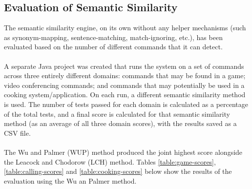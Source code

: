 \documentclass[11pt]{article}
\begin{document}
\subsection{Evaluation of Semantic Similarity}

The semantic similarity engine, on its own without any helper mechanisms (such as synonym-mapping, sentence-matching, match-ignoring, etc.), has been evaluated based on the number of different commands that it can detect.
\\
\\
A separate Java project was created that runs the system on a set of commands across three entirely different domains: commands that may be found in a game; video conferencing commands; and commands that may potentially be used in a cooking system/application. On each run, a different semantic similarity method is used. The number of tests passed for each domain is calculated as a percentage of the total tests, and a final score is calculated for that semantic similarity method (as an average of all three domain scores), with the results saved as a CSV file.
\\
\\
The Wu and Palmer (WUP) method produced the joint highest score alongside the Leacock and Chodorow (LCH) method. Tables \ref{table:game-scores}, \ref{table:calling-scores} and \ref{table:cooking-scores} below show the results of the evaluation using the Wu an Palmer method.
\end{document}
